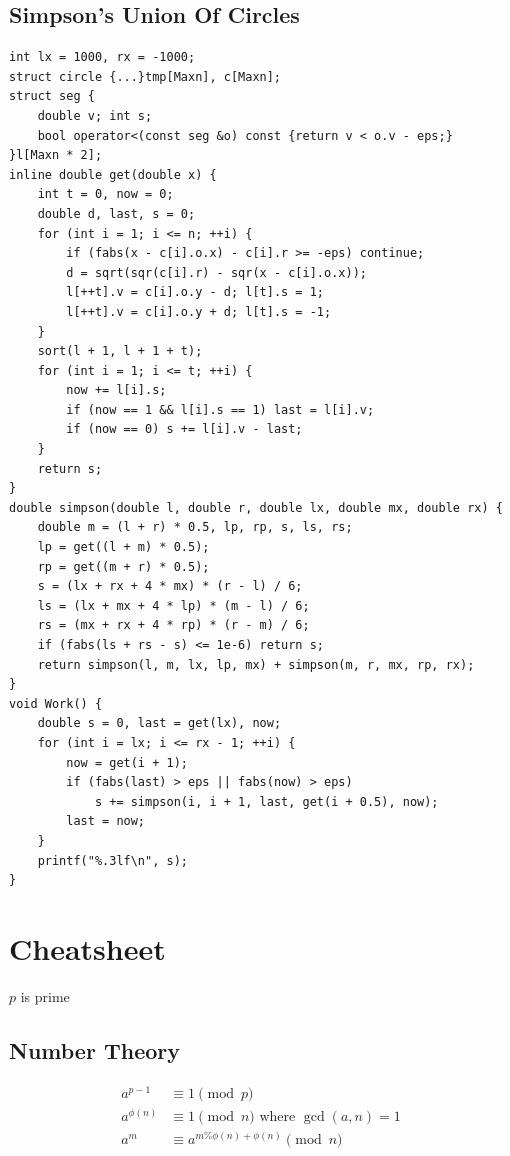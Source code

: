 \documentclass[10pt,letterpaper,landscape]{article}
\begin{document}
\begin{multicols}{2}
\subsection{Simpson's Union Of Circles}
\begin{lstlisting}
int lx = 1000, rx = -1000;
struct circle {...}tmp[Maxn], c[Maxn];
struct seg {
    double v; int s;
    bool operator<(const seg &o) const {return v < o.v - eps;}
}l[Maxn * 2];
inline double get(double x) {
    int t = 0, now = 0;
    double d, last, s = 0;
    for (int i = 1; i <= n; ++i) {
        if (fabs(x - c[i].o.x) - c[i].r >= -eps) continue;
        d = sqrt(sqr(c[i].r) - sqr(x - c[i].o.x));
        l[++t].v = c[i].o.y - d; l[t].s = 1;
        l[++t].v = c[i].o.y + d; l[t].s = -1;
    }
    sort(l + 1, l + 1 + t);
    for (int i = 1; i <= t; ++i) {
        now += l[i].s;
        if (now == 1 && l[i].s == 1) last = l[i].v;
        if (now == 0) s += l[i].v - last;
    }
    return s;
}
double simpson(double l, double r, double lx, double mx, double rx) {
    double m = (l + r) * 0.5, lp, rp, s, ls, rs;
    lp = get((l + m) * 0.5);
    rp = get((m + r) * 0.5);
    s = (lx + rx + 4 * mx) * (r - l) / 6;
    ls = (lx + mx + 4 * lp) * (m - l) / 6;
    rs = (mx + rx + 4 * rp) * (r - m) / 6;
    if (fabs(ls + rs - s) <= 1e-6) return s;
    return simpson(l, m, lx, lp, mx) + simpson(m, r, mx, rp, rx);
}
void Work() {
    double s = 0, last = get(lx), now;
    for (int i = lx; i <= rx - 1; ++i) {
        now = get(i + 1);
        if (fabs(last) > eps || fabs(now) > eps)
            s += simpson(i, i + 1, last, get(i + 0.5), now);
        last = now;
    }
    printf("%.3lf\n", s);
}
\end{lstlisting}

\newpage

\section{Cheatsheet}

$p$ is prime

\subsection{Number Theory}

\begin{align*}
	a^{p-1} &\equiv 1 \pmod{p} \\ %
	a^{\phi(n)} &\equiv 1 \pmod{n} \text{ where } \gcd(a,n) = 1 \\ %
	a^m &\equiv a^{m \% \phi(n) + \phi(n)} \pmod{n}
\end{align*}


\end{multicols}
\end{document}
